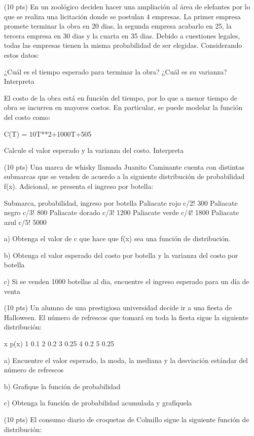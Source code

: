 \documentclass[addpoints]{exam}
\theoremstyle{mytheor}
\begin{document}
  \begin{questions}
  
\question (10 pts) En un zoológico deciden hacer una ampliación al área de elefantes por lo que se realiza una licitación donde se postulan 4 empresas. La primer empresa promete terminar la obra en 20 dias, la segunda empresa acabarlo en 25, la tercera empresa en 30 dias y la cuarta en 35 dias. Debido a cuestiones legales, todas las empresas tienen la misma probabilidad de ser elegidas. Considerando estos datos:

¿Cuál es el tiempo esperado para terminar la obra?
¿Cuál es su varianza? Interpreta

El costo de la obra está en función del tiempo, por lo que a menor tiempo de obra se incurren en mayores costos. En particular, se puede modelar la función del costo como:

C(T) = 10T**2+1000T+505

Calcule el valor esperado y la varianza del costo. Interpreta

\question (10 pts) 
Una marca de whisky llamada Juanito Caminante cuenta con distintas submarcas que se venden de acuerdo a la siguiente distribución de probabilidad f(x). Adicional, se presenta el ingreso por botella:

Submarca, probabilidad, ingreso por botella
Paliacate rojo c/2! 300
Paliacate negro c/3! 800
Paliacate dorado c/3! 1200
Paliacate verde c/4! 1800
Paliacate azul c/5! 5000

a) Obtenga el valor de c que hace que f(x) sea una función de distribución.

b) Obtenga el valor esperado del costo por botella y la varianza del costo por botella 

c) Si se venden 1000 botellas al dia, encuentre el ingreso esperado para un día de venta 

\question (10 pts) 
Un alumno de una prestigiosa universidad decide ir a una fiesta de Halloween. El número de refrescos que tomará en toda la fiesta sigue la siguiente distribución:

x p(x)
1 0.1
2 0.2
3 0.25
4 0.2
5 0.25

a) Encuentre el valor esperado, la moda, la mediana y la desviación estándar del número de refrescos

b) Grafique la función de probabilidad

c) Obtenga la función de probabilidad acumulada y grafíquela

\question (10 pts) 
El consumo diario de croquetas de Colmillo sigue la siguiente función de distribución:


\end{questions}
\end{document}
